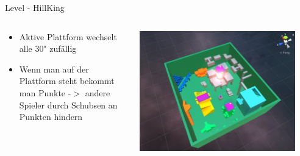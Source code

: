\documentclass[xcolor=dvipsnames]{beamer}
\begin{document}
\begin{frame}{Level - HillKing}
\begin{columns}
\begin{column}{0.5\textwidth}
	\begin{itemize}
		\item Aktive Plattform wechselt alle 30" zufällig 
		\item Wenn man auf der Plattform steht bekommt man Punkte -$>$ andere Spieler durch Schubsen an Punkten hindern 
	\end{itemize}
\end{column}
\begin{column}{0.5\textwidth} 
	\begin{center}
		\includegraphics[width=0.9\textwidth]{level_hillking.png}
	\end{center}
\end{column}
\end{columns}

\end{frame}
\end{document}
